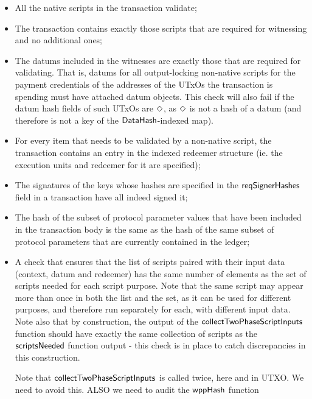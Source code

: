 \begin{itemize}

\item All the native scripts in the transaction validate;

\item The transaction contains exactly those scripts that are required for witnessing and no
additional ones;

    \item The datums included in the witnesses are exactly those that are required for validating. That is,
    datums for all output-locking non-native scripts for the payment credentials of the addresses of the
    UTxOs the transaction is spending must have attached datum objects. This check will also fail if
    the datum hash fields of such UTxOs are $\Diamond$, as $\Diamond$ is not a
    hash of a datum (and therefore is not a key of the $\mathsf{DataHash}$-indexed map).

    \item For every item that needs to be validated by a non-native script, the transaction contains
      an entry in the indexed redeemer structure (ie. the execution units and redeemer for it are specified);

    \item The signatures of the keys whose hashes are specified in the
    $\mathsf{reqSignerHashes}$ field in a transaction
    have all indeed signed it;

    \item
    The hash of the subset of protocol parameter values that have been included in the transaction body is the same as
    the hash of the same subset of protocol parameters that are currently contained in the ledger;

    \item A check that ensures that the list of scripts paired with their input data (context, datum and redeemer)
    has the same number of elements as the set of scripts needed for each script purpose. Note that the same
    script may appear more than once in both the list and the set, as it can be used for different purposes, and therefore
    run separately for each, with different input data. Note also that by construction, the output of
    the $\mathsf{collectTwoPhaseScriptInputs}$ function should have exactly the same collection of scripts as
    the $\mathsf{scriptsNeeded}$ function output - this check is in place to catch discrepancies in this construction.
    \begin{note}
      Note that $\mathsf{collectTwoPhaseScriptInputs}$ is called twice, here and in UTXO. We need to avoid this.
      ALSO we need to audit the $\mathsf{wppHash}$ function
    \end{note}
\end{itemize}

